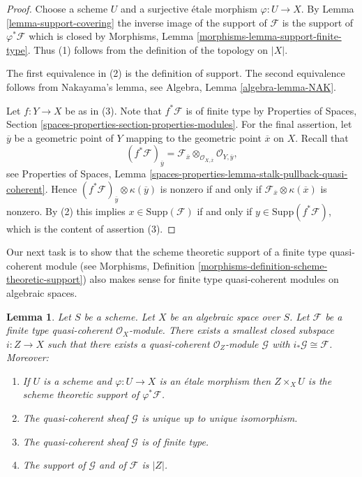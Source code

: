 \documentclass{stacks-project}
\theoremstyle{plain}
\newtheorem{lemma}[subsection]{Lemma}
\theoremstyle{definition}
\theoremstyle{remark}
\numberwithin{equation}{subsection}
\begin{document}
\begin{proof}
Choose a scheme $U$ and a surjective \'etale morphism $\varphi : U \to X$.
By Lemma \ref{lemma-support-covering} the inverse image of the support of
$\mathcal{F}$ is the support of $\varphi^*\mathcal{F}$ which is closed by
Morphisms, Lemma \ref{morphisms-lemma-support-finite-type}.
Thus (1) follows from the definition of the topology on $|X|$.

\medskip\noindent
The first equivalence in (2) is the definition of support.
The second equivalence follows from Nakayama's lemma, see
Algebra, Lemma \ref{algebra-lemma-NAK}.

\medskip\noindent
Let $f : Y \to X$ be as in (3). Note that $f^*\mathcal{F}$ is of finite type
by Properties of Spaces, Section
\ref{spaces-properties-section-properties-modules}.
For the final assertion, let $\overline{y}$ be a geometric point of $Y$
mapping to the geometric point $\overline{x}$ on $X$. Recall that
$$
(f^*\mathcal{F})_{\overline{y}} =
\mathcal{F}_{\overline{x}} \otimes_{\mathcal{O}_{X, \overline{x}}}
\mathcal{O}_{Y, \overline{y}},
$$
see Properties of Spaces, Lemma
\ref{spaces-properties-lemma-stalk-pullback-quasi-coherent}.
Hence $(f^*\mathcal{F})_{\overline{y}} \otimes \kappa(\overline{y})$
is nonzero if and only if
$\mathcal{F}_{\overline{x}} \otimes \kappa(\overline{x})$ is nonzero.
By (2) this implies $x \in \text{Supp}(\mathcal{F})$ if and only
if $y \in \text{Supp}(f^*\mathcal{F})$, which is the content of
assertion (3).
\end{proof}

\noindent
Our next task is to show that the scheme theoretic support
of a finite type quasi-coherent module (see
Morphisms, Definition \ref{morphisms-definition-scheme-theoretic-support})
also makes sense for finite type quasi-coherent modules on
algebraic spaces.

\begin{lemma}
\label{lemma-scheme-theoretic-support}
Let $S$ be a scheme. Let $X$ be an algebraic space over $S$.
Let $\mathcal{F}$ be a finite type quasi-coherent $\mathcal{O}_X$-module.
There exists a smallest closed subspace $i : Z \to X$ such that there
exists a quasi-coherent $\mathcal{O}_Z$-module $\mathcal{G}$ with
$i_*\mathcal{G} \cong \mathcal{F}$. Moreover:
\begin{enumerate}
\item If $U$ is a scheme and $\varphi : U \to X$ is an \'etale morphism
then $Z \times_X U$ is the scheme theoretic support of $\varphi^*\mathcal{F}$.
\item The quasi-coherent sheaf $\mathcal{G}$ is unique up to unique
isomorphism.
\item The quasi-coherent sheaf $\mathcal{G}$ is of finite type.
\item The support of $\mathcal{G}$ and of $\mathcal{F}$ is $|Z|$.
\end{enumerate}
\end{lemma}
\end{document}
